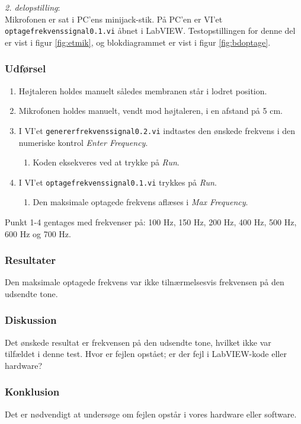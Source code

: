 		\textit{2. delopstilling}:\\
		Mikrofonen er sat i PC'ens minijack-stik. På PC'en er VI'et \texttt{optagefrekvenssignal0.1.vi} åbnet i LabVIEW. Testopstillingen for denne del er vist i figur \ref{fig:etmik}, og blokdiagrammet er vist i figur \ref{fig:bdoptage}.\\ 
		
		\subsubsection{Udførsel}
			\begin{enumerate}
				\item Højtaleren holdes manuelt således membranen står i lodret position. 
				\item Mikrofonen holdes manuelt, vendt mod højtaleren, i en afstand på 5 cm. 
				\item I VI'et \texttt{genererfrekvenssignal0.2.vi} indtastes den ønskede frekvens i den numeriske kontrol \textit{Enter Frequency}. 
					\begin{enumerate}
						\item Koden eksekveres ved at trykke på \textit{Run}. 
					\end{enumerate} 
				\item I VI'et \texttt{optagefrekvenssignal0.1.vi} trykkes på \textit{Run}. 
					\begin{enumerate}
						\item Den maksimale optagede frekvens aflæses i \textit{Max Frequency}. 
					\end{enumerate}	  
			\end{enumerate}
			
			Punkt 1-4 gentages med frekvenser på: 100 Hz, 150 Hz, 200 Hz, 400 Hz, 500 Hz, 600 Hz og 700 Hz. 
			
			\subsubsection{Resultater}
			Den maksimale optagede frekvens var ikke tilnærmelsesvis frekvensen på den udsendte tone.
			\subsubsection{Diskussion}
			Det ønskede resultat er frekvensen på den udsendte tone, hvilket ikke var tilfældet i denne test. Hvor er fejlen opstået; er der fejl i LabVIEW-kode eller hardware? 
			\subsubsection{Konklusion}
			Det er nødvendigt at undersøge om fejlen opstår i vores hardware eller software. 
